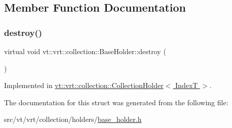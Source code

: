 \subsection{Member Function Documentation}
\mbox{\label{structvt_1_1vrt_1_1collection_1_1_base_holder_a56c8289f60121e38f3699bcfafbbd491}} 
\subsubsection{\texorpdfstring{destroy()}{destroy()}}
{\footnotesize\ttfamily virtual void vt\+::vrt\+::collection\+::\+Base\+Holder\+::destroy (\begin{DoxyParamCaption}{ }\end{DoxyParamCaption})\hspace{0.3cm}{\ttfamily [pure virtual]}}



Implemented in \hyperlink{structvt_1_1vrt_1_1collection_1_1_collection_holder_a00a325a6c9c321d00b6b6eb0fdfbfb9f}{vt\+::vrt\+::collection\+::\+Collection\+Holder$<$ Index\+T $>$}.



The documentation for this struct was generated from the following file\+:\begin{DoxyCompactItemize}
\item 
src/vt/vrt/collection/holders/\hyperlink{base__holder_8h}{base\+\_\+holder.\+h}\end{DoxyCompactItemize}
